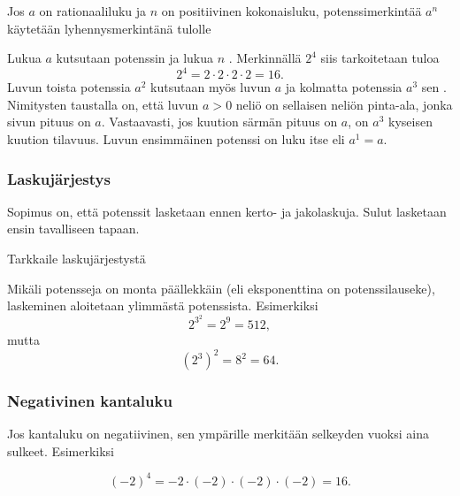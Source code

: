 Jos $a$ on rationaaliluku ja $n$ on positiivinen kokonaisluku, potenssimerkintää $a^n$ käytetään lyhennysmerkintänä tulolle
   
\laatikko[Potenssi]{    \[
        a^n = \underbrace{a\cdot \ldots \cdot a}_{n\text{ kpl}}. 
    \]}
    
Lukua $a$ kutsutaan potenssin  ja lukua $n$ . Merkinnällä $2^4$ siis tarkoitetaan tuloa 
        \[
            2^4=2\cdot 2\cdot 2\cdot 2=16.
        \]
Luvun toista potenssia $a^2$ kutsutaan myös luvun $a$  ja kolmatta potenssia $a^3$ sen . Nimitysten taustalla on,
että luvun $a>0$ neliö on sellaisen neliön pinta-ala, jonka sivun pituus on $a$. Vastaavasti, jos kuution särmän pituus on $a$, on $a^3$ kyseisen kuution tilavuus.
Luvun ensimmäinen potenssi on luku itse eli $a^1 = a$.

\subsubsection*{Laskujärjestys}

Sopimus on, että potenssit lasketaan ennen kerto- ja jakolaskuja. Sulut lasketaan ensin tavalliseen tapaan.

    \begin{esimerkki}
      Tarkkaile laskujärjestystä
    \end{esimerkki}  

Mikäli potensseja on monta päällekkäin (eli eksponenttina on potenssilauseke),
laskeminen aloitetaan ylimmästä potenssista. Esimerkiksi
\[2^{3^2}= 2^9 = 512, \]
mutta
\[(2^3)^2=8^2=64. \]

   
%  

\subsubsection*{Negativinen kantaluku}

Jos kantaluku on negatiivinen, sen ympärille merkitään selkeyden vuoksi
aina sulkeet. Esimerkiksi

\[ (-2)^4 = -2 \cdot (-2)\cdot(-2)\cdot(-2) = 16. \]

